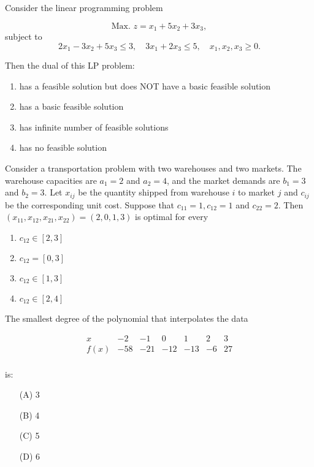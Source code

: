 \item Consider the linear programming problem

\begin{equation*}
\text{Max. } z = x_1 + 5x_2 + 3x_3,
\end{equation*}
subject to
\begin{equation*}
2x_1 - 3x_2 + 5x_3 \leq 3, \quad 3x_1 + 2x_3 \leq 5, \quad x_1, x_2, x_3 \geq 0.
\end{equation*}

Then the dual of this LP problem:

\begin{enumerate}
    \item has a feasible solution but does NOT have a basic feasible solution
    \item has a basic feasible solution
    \item has infinite number of feasible solutions
    \item has no feasible solution
\end{enumerate}

\item Consider a transportation problem with two warehouses and two markets. The warehouse capacities are $a_1 = 2$ and $a_2 = 4$, and the market demands are $b_1 = 3$ and $b_2 = 3$. Let $x_{ij}$ be the quantity shipped from warehouse $i$ to market $j$ and $c_{ij}$ be the corresponding unit cost. Suppose that $c_{11} = 1, c_{12} = 1$ and $c_{22} = 2$. Then $(x_{11}, x_{12}, x_{21}, x_{22}) = (2, 0, 1, 3)$ is optimal for every

\begin{enumerate}
    \item $c_{12} \in [2, 3]$
    \item $c_{12} = [0, 3]$
    \item $c_{12} \in [1, 3]$
    \item $c_{12} \in [2, 4]$
\end{enumerate}
\item The smallest degree of the polynomial that interpolates the data

\[
\begin{array}{c|cccccc}
x & -2 & -1 & 0 & 1 & 2 & 3 \\
\hline
f(x) & -58 & -21 & -12 & -13 & -6 & 27 \\
\end{array}
\]

is:

\begin{enumerate}
    \item[(A)] 3
    \item[(B)] 4
    \item[(C)] 5
    \item[(D)] 6
\end{enumerate}

